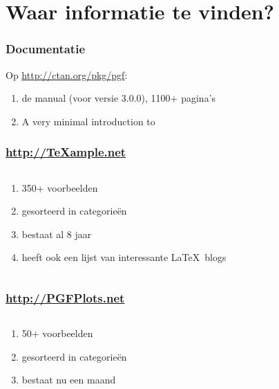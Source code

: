\section{Waar informatie te vinden?}

\begin{frame}
  \frametitle{Documentatie}

  Op \url{http://ctan.org/pkg/pgf}:
  \begin{enumerate}
    \item de manual (voor versie 3.0.0), 1100+ pagina's
    \item A very minimal introduction to \TikZ
  \end{enumerate}
\end{frame}

\begin{frame}
  \frametitle{\url{http://TeXample.net}}

  \begin{columns}
    \begin{column}{.4\textwidth}
      \begin{enumerate}
        \item 350+ voorbeelden
        \item gesorteerd in categorie\"en
        \item bestaat al 8 jaar
        \item heeft ook een lijst van interessante \LaTeX\ blogs
      \end{enumerate}
    \end{column}

    \begin{column}{.6\textwidth}
      \begin{flushright}
        
      \end{flushright}
    \end{column}
  \end{columns}
\end{frame}

\begin{frame}
  \frametitle{\url{http://PGFPlots.net}}

  \begin{columns}
    \begin{column}{.4\textwidth}
      \begin{enumerate}
        \item 50+ voorbeelden
        \item gesorteerd in categorie\"en
        \item bestaat nu een maand
      \end{enumerate}
    \end{column}

    \begin{column}{.6\textwidth}
      \begin{flushright}
        
      \end{flushright}
    \end{column}
  \end{columns}
\end{frame}

